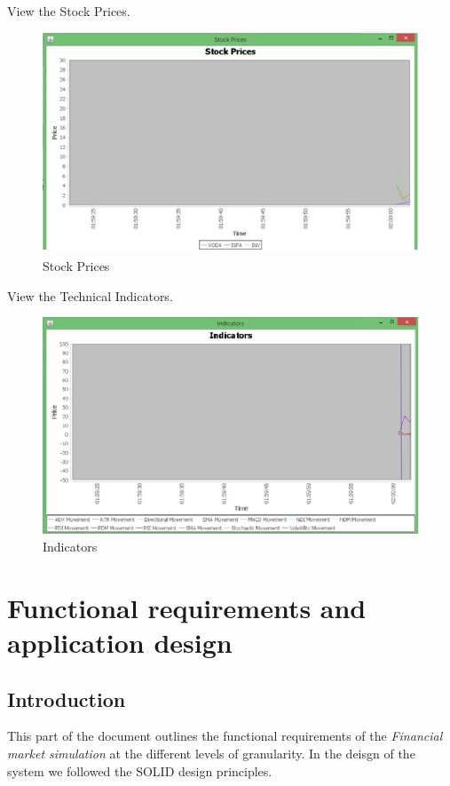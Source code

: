 \documentclass[12pt]{article}
\begin{document}
        View the Stock Prices.

	\begin{figure}[h!]
	\centering
	\includegraphics[scale=0.8]{stockprices}
	\caption{Stock Prices}
	\label{Stock Prices}
	\end{figure}
	
        View the Technical Indicators.

	\begin{figure}[h!]
	\centering
	\includegraphics[scale=0.8]{indicators}
	\caption{Indicators}
	\label{Indicators}
	\end{figure}
            
\newpage
	\section{Functional requirements and application design}
		\subsection{Introduction}	
		This part of the document outlines the functional requirements of the \textit{Financial market simulation} at the different levels of granularity. In the deisgn of the system we followed the SOLID design principles.\\ \\ 
		
\end{document}
